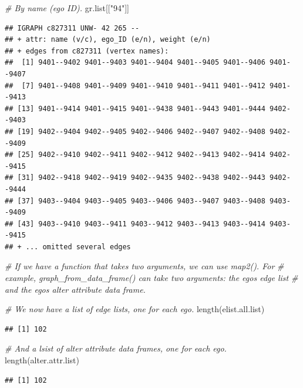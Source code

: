 \documentclass[
]{book}
\newenvironment{Shaded}{\begin{snugshade}}{\end{snugshade}}
\newcommand{\CommentTok}[1]{\textcolor[rgb]{0.56,0.35,0.01}{\textit{#1}}}
\newcommand{\FunctionTok}[1]{\textcolor[rgb]{0.00,0.00,0.00}{#1}}
\newcommand{\NormalTok}[1]{#1}
\newcommand{\StringTok}[1]{\textcolor[rgb]{0.31,0.60,0.02}{#1}}
\begin{document}
\begin{Shaded}
\begin{Highlighting}[]
\CommentTok{\# By name (ego ID).}
\NormalTok{gr.list[[}\StringTok{"94"}\NormalTok{]]}
\end{Highlighting}
\end{Shaded}

\begin{verbatim}
## IGRAPH c827311 UNW- 42 265 -- 
## + attr: name (v/c), ego_ID (e/n), weight (e/n)
## + edges from c827311 (vertex names):
##  [1] 9401--9402 9401--9403 9401--9404 9401--9405 9401--9406 9401--9407
##  [7] 9401--9408 9401--9409 9401--9410 9401--9411 9401--9412 9401--9413
## [13] 9401--9414 9401--9415 9401--9438 9401--9443 9401--9444 9402--9403
## [19] 9402--9404 9402--9405 9402--9406 9402--9407 9402--9408 9402--9409
## [25] 9402--9410 9402--9411 9402--9412 9402--9413 9402--9414 9402--9415
## [31] 9402--9418 9402--9419 9402--9435 9402--9438 9402--9443 9402--9444
## [37] 9403--9404 9403--9405 9403--9406 9403--9407 9403--9408 9403--9409
## [43] 9403--9410 9403--9411 9403--9412 9403--9413 9403--9414 9403--9415
## + ... omitted several edges
\end{verbatim}

\begin{Shaded}
\begin{Highlighting}[]
\CommentTok{\# If we have a function that takes two arguments, we can use map2(). For}
\CommentTok{\# example, graph\_from\_data\_frame() can take two arguments: the ego\textquotesingle{}s edge list}
\CommentTok{\# and the ego\textquotesingle{}s alter attribute data frame. }

\CommentTok{\# We now have a list of edge lists, one for each ego.}
\FunctionTok{length}\NormalTok{(elist.all.list)}
\end{Highlighting}
\end{Shaded}

\begin{verbatim}
## [1] 102
\end{verbatim}

\begin{Shaded}
\begin{Highlighting}[]
\CommentTok{\# And a lsist of alter attribute data frames, one for each ego.}
\FunctionTok{length}\NormalTok{(alter.attr.list)}
\end{Highlighting}
\end{Shaded}

\begin{verbatim}
## [1] 102
\end{verbatim}
\end{document}
